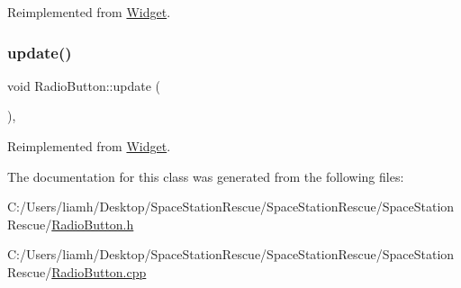 Reimplemented from \mbox{\hyperlink{class_widget_a038576de7f1adf6b29f3ebfd3515f13f}{Widget}}.

\mbox{\label{class_radio_button_add936c8d72748870cdb8f8d0416e8068}} 
\subsubsection{\texorpdfstring{update()}{update()}}
{\footnotesize\ttfamily void Radio\+Button\+::update (\begin{DoxyParamCaption}{ }\end{DoxyParamCaption})\hspace{0.3cm}{\ttfamily [override]}, {\ttfamily [virtual]}}



Reimplemented from \mbox{\hyperlink{class_widget_a38aacc92bda1a1e91052873a4a955487}{Widget}}.



The documentation for this class was generated from the following files\+:\begin{DoxyCompactItemize}
\item 
C\+:/\+Users/liamh/\+Desktop/\+Space\+Station\+Rescue/\+Space\+Station\+Rescue/\+Space\+Station\+Rescue/\mbox{\hyperlink{_radio_button_8h}{Radio\+Button.\+h}}\item 
C\+:/\+Users/liamh/\+Desktop/\+Space\+Station\+Rescue/\+Space\+Station\+Rescue/\+Space\+Station\+Rescue/\mbox{\hyperlink{_radio_button_8cpp}{Radio\+Button.\+cpp}}\end{DoxyCompactItemize}
